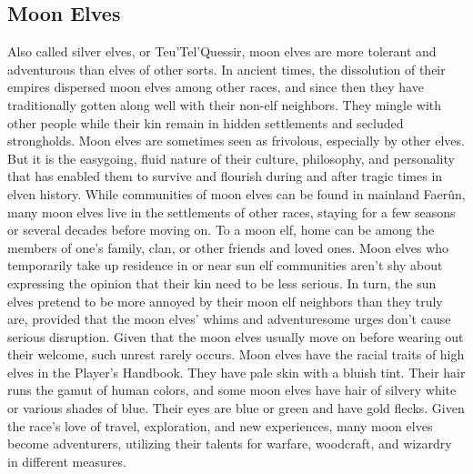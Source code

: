 \documentclass[10pt,a4paper,twoside,twocolumn,openany,bg=print,nodeprecatedcode]{dndbook}
\begin{document}
\subsection{Moon Elves}
Also called silver elves, or Teu'Tel'Quessir, moon elves are more tolerant and adventurous than elves of other sorts. In ancient times, the dissolution of their empires dispersed moon elves among other races, and since then they have traditionally gotten along well with their non-elf neighbors. They mingle with other people while their kin remain in hidden settlements and secluded strongholds.
Moon elves are sometimes seen as frivolous, especially by other elves. But it is the easygoing, fluid nature of their culture, philosophy, and personality that has enabled them to survive and flourish during and after tragic times in elven history. While communities of moon elves can be found in mainland Faerûn, many moon elves live in the settlements of other races, staying for a few seasons or several decades before moving on.
To a moon elf, home can be among the members of one's family, clan, or other friends and loved ones. Moon elves who temporarily take up residence in or near sun elf communities aren't shy about expressing the opinion that their kin need to be less serious. In turn, the sun elves pretend to be more annoyed by their moon elf neighbors than they truly are, provided that the moon elves' whims and adventuresome urges don't cause serious disruption. Given that the moon elves usually move on before wearing out their welcome, such unrest rarely occurs.
Moon elves have the racial traits of high elves in the Player's Handbook. They have pale skin with a bluish tint. Their hair runs the gamut of human colors, and some moon elves have hair of silvery white or various shades of blue. Their eyes are blue or green and have gold flecks.
Given the race's love of travel, exploration, and new experiences, many moon elves become adventurers, utilizing their talents for warfare, woodcraft, and wizardry in different measures.
\end{document}
